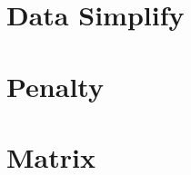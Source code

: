 \documentclass[12pt,twoside]{report}
\begin{document}
\chapter{Data Simplify}

\clearemptydoublepage




\clearemptydoublepage





\begin{appendices}
\makeatletter
{}
\makeatother
 \chapter{Penalty}
 
 \chapter{Matrix}
  
\end{appendices}
\end{document}
